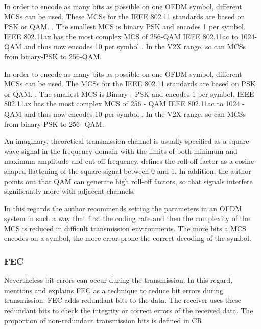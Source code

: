 In order to encode as many bits as possible on one \ac{OFDM} symbol, different \ac{MCS}s can be used.   
These \ac{MCS}s for the IEEE 802.11 standards are based on \ac{PSK} or \ac{QAM}. \cite{kauffels_wireless_2002}. 
The smallest \ac{MCS} is binary \ac{PSK} and encodes \SI{1}{\bit} per symbol. IEEE 802.11ax has the most complex \ac{MCS} of \num{256}-\ac{QAM} IEEE 802.11ac to \num{1024}-\ac{QAM} and thus now encodes \SI{10}{\bit} per symbol \cite{afaqui_ieee_2017}.
In the \ac{V2X} range, so can \ac{MCS}s from binary-\ac{PSK} to \num{256}-\ac{QAM}.

In order to encode as many bits as possible on one \ac{OFDM} symbol, different \ac{MCS}s can be used.   
The \ac{MCS}s for the IEEE 802.11 standards are based on \ac{PSK} or \ac{QAM}. \cite{kauffels_wireless_2002}. 
The smallest \ac{MCS} is Binary - \ac{PSK} and encodes \SI{1}{\bit} per symbol. IEEE 802.11ax has the most complex \ac{MCS} of \num{256} - \ac{QAM} IEEE 802.11ac to \num{1024} - \ac{QAM} and thus now encodes \SI{10}{\bit} per symbol \cite{afaqui_ieee_2017}.
In the \ac{V2X} range, so can \ac{MCS}s from binary-\ac{PSK} to \num{256}- \ac{QAM}.

An imaginary, theoretical transmission channel is usually specified as a square-wave signal in the frequency domain with the limits of both minimum and maximum amplitude and cut-off frequency. \textcite{kauffels_wireless_2002} defines the roll-off factor as a cosine-shaped flattening of the square signal between 0 and 1. In addition, the author points out that \ac{QAM} can generate high roll-off factors, so that signals interfere significantly more with adjacent channels.

In this regards the author recommends setting the parameters in an \ac{OFDM} system in such a way that first the coding rate and then the complexity of the \ac{MCS} is reduced in difficult transmission environments. The more bits a \ac{MCS} encodes on a symbol, the more error-prone the correct decoding of the symbol.

\subsubsection*{\acf{FEC}}

Nevertheless bit errors can occur during the transmission. In this regard, \cite{kauffels_wireless_2002} mentions and explains \ac{FEC} as a technique to reduce bit errors during transmission. \ac{FEC} adds redundant bits to the data. The receiver uses these redundant bits to check the integrity or correct errors of the received data. The proportion of non-redundant transmission bits is defined in \ac{CR} 

